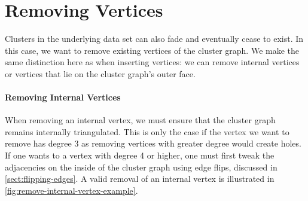 \section{Removing Vertices}
\label{sect:removing-vertices}

Clusters in the underlying data set can also fade and eventually cease to exist. In this case, we want to remove existing vertices of the cluster graph. We make the same distinction here as when inserting vertices: we can remove internal vertices or vertices that lie on the cluster graph's outer face. 



\paragraph{Removing Internal Vertices}

When removing an internal vertex, we must ensure that the cluster graph remains internally triangulated. This is only the case if the vertex we want to remove has degree 3 as removing vertices with greater degree would create holes. If one wants to a vertex with degree 4 or higher, one must first tweak the adjacencies on the inside of the cluster graph using edge flips, discussed in \cref{sect:flipping-edges}. A valid removal of an internal vertex is illustrated in \cref{fig:remove-internal-vertex-example}.

